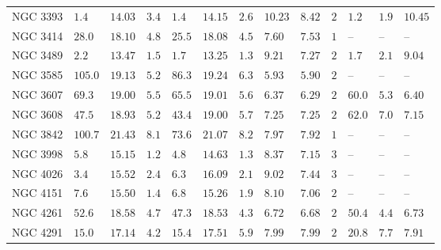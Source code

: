 \begin{table*}
\begin{center}
\begin{tabular}{lllllllllllll}
NGC 3393  \quad &  $1.4$  &  $14.03$  &  $3.4$  \quad \quad &  $1.4$  &  $14.15$  &  $2.6$  &  $10.23$  &  $8.42$  \quad \quad &  $2$  \quad \quad &  $1.2$  &  $1.9$  &  $10.45$  \\ 
NGC 3414  \quad &  $28.0$  &  $18.10$  &  $4.8$  \quad \quad &  $25.5$  &  $18.08$  &  $4.5$  &  $7.60$  &  $7.53$  \quad \quad &  $1$  \quad \quad &   -- &   -- &   --    \\ 
NGC 3489  \quad &  $2.2$  &  $13.47$  &  $1.5$  \quad \quad &  $1.7$  &  $13.25$  &  $1.3$  &  $9.21$  &  $7.27$  \quad \quad &  $2$  \quad \quad &  $1.7$  &  $2.1$  &  $9.04$  \\ 
NGC 3585  \quad &  $105.0$  &  $19.13$  &  $5.2$  \quad \quad &  $86.3$  &  $19.24$  &  $6.3$  &  $5.93$  &  $5.90$  \quad \quad &  $2$  \quad \quad &   -- &   -- &   --    \\ 
NGC 3607  \quad &  $69.3$  &  $19.00$  &  $5.5$  \quad \quad &  $65.5$  &  $19.01$  &  $5.6$  &  $6.37$  &  $6.29$  \quad \quad &  $2$  \quad \quad &  $60.0$  &  $5.3$  &  $6.40$  \\ 
NGC 3608  \quad &  $47.5$  &  $18.93$  &  $5.2$  \quad \quad &  $43.4$  &  $19.00$  &  $5.7$  &  $7.25$  &  $7.25$  \quad \quad &  $2$  \quad \quad &  $62.0$  &  $7.0$  &  $7.15$  \\ 
NGC 3842  \quad &  $100.7$  &  $21.43$  &  $8.1$  \quad \quad &  $73.6$  &  $21.07$  &  $8.2$  &  $7.97$  &  $7.92$  \quad \quad &  $1$  \quad \quad &   -- &   -- &   --    \\ 
NGC 3998  \quad &  $5.8$  &  $15.15$  &  $1.2$  \quad \quad &  $4.8$  &  $14.63$  &  $1.3$  &  $8.37$  &  $7.15$  \quad \quad &  $3$  \quad \quad &   -- &   -- &   --    \\ 
NGC 4026  \quad &  $3.4$  &  $15.52$  &  $2.4$  \quad \quad &  $6.3$  &  $16.09$  &  $2.1$  &  $9.02$  &  $7.44$  \quad \quad &  $3$  \quad \quad &   -- &   -- &   --    \\ 
NGC 4151  \quad &  $7.6$  &  $15.50$  &  $1.4$  \quad \quad &  $6.8$  &  $15.26$  &  $1.9$  &  $8.10$  &  $7.06$  \quad \quad &  $2$  \quad \quad &   -- &   -- &   --    \\ 
NGC 4261  \quad &  $52.6$  &  $18.58$  &  $4.7$  \quad \quad &  $47.3$  &  $18.53$  &  $4.3$  &  $6.72$  &  $6.68$  \quad \quad &  $2$  \quad \quad &  $50.4$  &  $4.4$  &  $6.73$  \\ 
NGC 4291  \quad &  $15.0$  &  $17.14$  &  $4.2$  \quad \quad &  $15.4$  &  $17.51$  &  $5.9$  &  $7.99$  &  $7.99$  \quad \quad &  $2$  \quad \quad &  $20.8$  &  $7.7$  &  $7.91$  \\ 

\end{tabular}
\end{center}
\end{table*}
